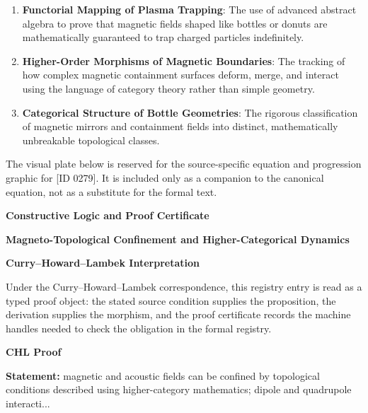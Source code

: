 \begin{enumerate}[leftmargin=1.6em,itemsep=6pt,topsep=4pt]
\item \textbf{Functorial Mapping of Plasma Trapping}: The use of advanced abstract algebra to prove that magnetic fields shaped like bottles or donuts are mathematically guaranteed to trap charged particles indefinitely.
\item \textbf{Higher-Order Morphisms of Magnetic Boundaries}: The tracking of how complex magnetic containment surfaces deform, merge, and interact using the language of category theory rather than simple geometry.
\item \textbf{Categorical Structure of Bottle Geometries}: The rigorous classification of magnetic mirrors and containment fields into distinct, mathematically unbreakable topological classes.
\end{enumerate}

\begingroup\footnotesize\sloppy
The visual plate below is reserved for the source-specific equation and progression graphic for [ID 0279]. It is included only as a companion to the canonical equation, not as a substitute for the formal text.
\par\endgroup
\ifTZPDarkEdition
{}
\fi

\clearpage
\begingroup\tzpsupportsetup
\noindent\textbf{\fontsize{10.8pt}{12.8pt}\selectfont [ID 0279] Constructive Logic and Proof Certificate}\par
\noindent\textbf{\fontsize{10pt}{12pt}\selectfont Magneto-Topological Confinement and Higher-Categorical Dynamics}\par
\vspace{0.45em}
\begingroup
\footnotesize
\setlength{\parskip}{0.22em}
\setlength{\parindent}{0pt}
\noindent\textbf{Curry--Howard--Lambek Interpretation}\par
Under the Curry--Howard--Lambek correspondence, this registry entry is read as a typed proof
object: the stated source condition supplies the proposition, the derivation supplies the
morphism, and the proof certificate records the machine handles needed to check the obligation
in the formal registry.

\vspace{0.45em}
\noindent\textbf{CHL Proof}\par
\textbf{Statement:} magnetic and acoustic fields can be confined by topological conditions described using
higher-category mathematics; dipole and quadrupole interacti...

